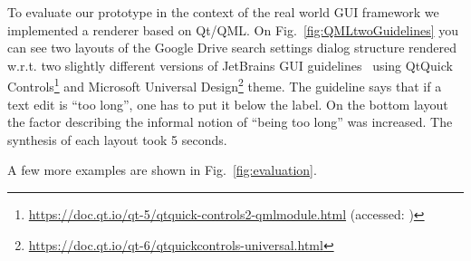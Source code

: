 


To evaluate our prototype in the context of the real world GUI framework we implemented a renderer based on Qt/QML.
On Fig.~\ref{fig:QMLtwoGuidelines} you can see two layouts of the
Google Drive search settings dialog structure rendered  w.r.t. two slightly different versions of JetBrains GUI guidelines~\cite{JBG} using QtQuick Controls\footnote{\url{https://doc.qt.io/qt-5/qtquick-controls2-qmlmodule.html}  (accessed: )} and Microsoft Universal Design\footnote{\url{https://doc.qt.io/qt-6/qtquickcontrols-universal.html}} theme.
The guideline says that if a text edit is ``too long'', one has to put it below the label.
On the bottom layout the factor describing the informal notion of ``being too long'' was increased.
The synthesis of each layout took 5 seconds.

A few more examples are shown in Fig.~\ref{fig:evaluation}.



